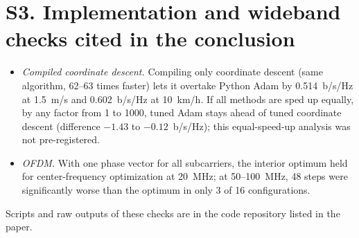\documentclass[journal,onecolumn]{IEEEtran}
\begin{document}
\section*{S3. Implementation and wideband checks cited in the conclusion}
\begin{itemize}
\item \emph{Compiled coordinate descent.} Compiling only coordinate descent (same algorithm, 62--63 times faster) lets it overtake Python Adam by 0.514~b/s/Hz at 1.5~m/s and 0.602~b/s/Hz at 10~km/h. If all methods are sped up equally, by any factor from 1 to 1000, tuned Adam stays ahead of tuned coordinate descent (difference $-1.43$ to $-0.12$~b/s/Hz); this equal-speed-up analysis was not pre-registered.
\item \emph{OFDM.} With one phase vector for all subcarriers, the interior optimum held for center-frequency optimization at 20~MHz; at 50--100~MHz, 48 steps were significantly worse than the optimum in only 3 of 16 configurations.
\end{itemize}
Scripts and raw outputs of these checks are in the code repository listed in the paper.
\end{document}
